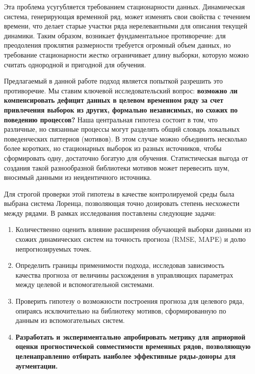 \documentclass[a4paper,12pt]{extarticle}
\begin{document}
Эта проблема усугубляется требованием стационарности данных. Динамическая система,
генерирующая временной ряд, может изменять свои свойства с течением времени, что
делает старые участки ряда нерелевантными для описания текущей динамики. Таким
образом, возникает фундаментальное противоречие: для преодоления проклятия размерности
 требуется огромный объем данных, но требование стационарности жестко ограничивает
 длину выборки, которую можно считать однородной и пригодной для обучения.

Предлагаемый в данной работе подход является попыткой разрешить это противоречие.
 Мы ставим ключевой исследовательский вопрос: \textbf{возможно ли компенсировать
  дефицит данных в целевом временном ряду за счет привлечения выборок из других,
   формально независимых, но схожих по поведению процессов?} Наша центральная гипотеза
    состоит в том, что различные, но связанные процессы могут разделять общий
     словарь локальных поведенческих паттернов (мотивов). В этом случае можно
     объединить несколько более коротких, но стационарных выборок из разных источников,
      чтобы сформировать одну, достаточно богатую для обучения. Статистическая выгода
      от создания такой разнообразной библиотеки мотивов может перевесить шум, вносимый
      данными из неидентичного источника.

Для строгой проверки этой гипотезы в качестве контролируемой среды была
 выбрана система Лоренца, позволяющая точно дозировать степень несхожести между рядами.
  В рамках исследования поставлены следующие задачи:
\begin{enumerate}
    \item Количественно оценить влияние расширения обучающей выборки данными
    из схожих динамических систем на точность прогноза (RMSE, MAPE) и долю непрогнозируемых точек.

    \item Определить границы применимости подхода, исследовав зависимость качества
    прогноза от величины расхождения в управляющих параметрах между целевой и вспомогательной системами.

    \item Проверить гипотезу о возможности построения прогноза для целевого ряда,
    опираясь исключительно на библиотеку мотивов, сформированную по данным из вспомогательных систем.

    \item \textbf{Разработать и экспериментально апробировать метрику для априорной оценки
    прогностической совместимости временных рядов, позволяющую целенаправленно
    отбирать наиболее эффективные ряды-доноры для аугментации.}
\end{enumerate}
\end{document}
